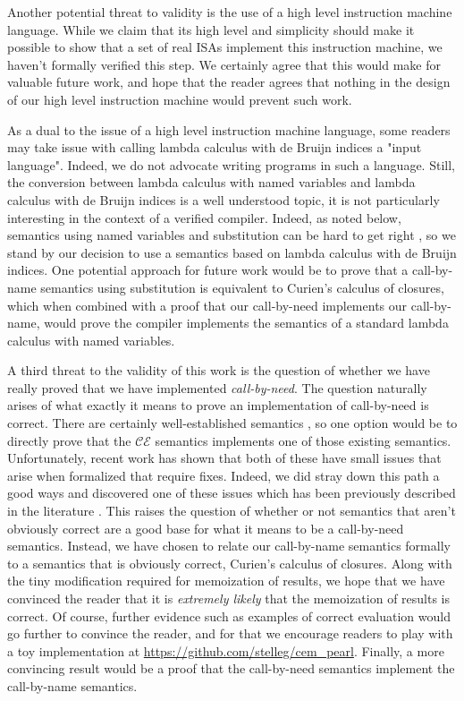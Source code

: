 Another potential threat to validity is the use of a high level instruction
machine language. While we claim that its high level and simplicity should make
it possible to show that a set of real ISAs implement this instruction machine,
we haven't formally verified this step. We certainly agree that this would make
for valuable future work, and hope that the reader agrees that nothing in the
design of our high level instruction machine would prevent such work.

As a dual to the issue of a high level instruction machine language, some
readers may take issue with calling lambda calculus with de Bruijn indices a
"input language". Indeed, we do not advocate writing programs in such a
language. Still, the conversion between lambda calculus with named variables and
lambda calculus with de Bruijn indices is a well understood topic, it is not
particularly interesting in the context of a verified compiler.  Indeed, as
noted below, semantics using named variables and substitution can be
hard to get right \cite{breitnerthesis, nakata2009small}, so we stand by our
decision to use a semantics based on lambda calculus with de Bruijn
indices. One potential approach for future work would be to prove that a
call-by-name semantics using substitution is equivalent to Curien's calculus of
closures, which when combined with a proof that our call-by-need implements our
call-by-name, would prove the compiler implements the semantics of a standard
lambda calculus with named variables.

A third threat to the validity of this work is the question of whether 
we have really proved that we have implemented \emph{call-by-need}. The question
naturally arises of what exactly it means to prove an implementation of
call-by-need is correct. There are certainly well-established semantics
\cite{launchburynatural, ariola1995call}, so one option would be to directly
prove that the $\mathcal{CE}$ semantics implements one of those existing
semantics.  Unfortunately, recent work has shown that both of these have small
issues that arise when formalized that require fixes. Indeed, we did stray down
this path a good ways and discovered one of these issues which has been
previously described in the literature \cite{nakata2009small}. This raises the
question of whether or not semantics that aren't obviously correct are a good
base for what it means to be a call-by-need semantics. Instead, we have chosen to
relate our call-by-name semantics formally to a semantics that is obviously
correct, Curien's calculus of closures. Along with the tiny modification
required for memoization of results, we hope that we have convinced the reader
that it is \emph{extremely likely} that the memoization of results is correct.
Of course, further evidence such as examples of correct evaluation would go
further to convince the reader, and for that we encourage readers to
play with a toy implementation at \url{https://github.com/stelleg/cem\_pearl}.
Finally, a more convincing result would be a proof that the call-by-need
semantics implement the call-by-name semantics. 

